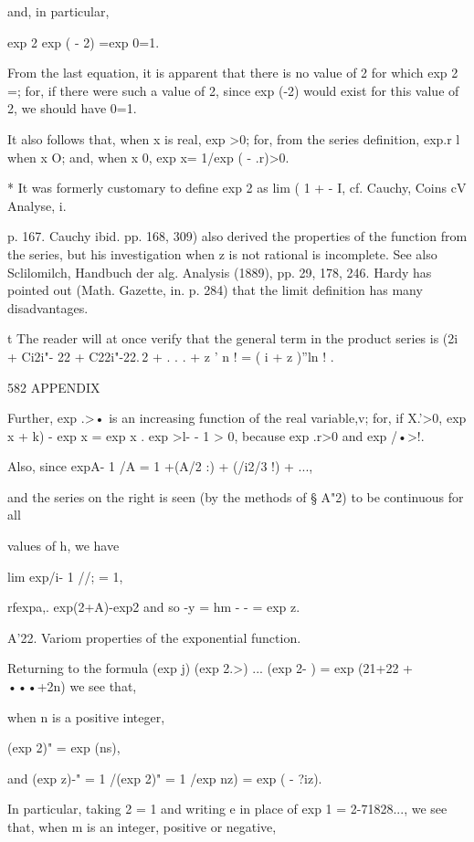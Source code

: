 and, in particular,

 exp 2 exp ( - 2) =exp 0=1.

From the last equation, it is apparent that there is no value of 2 for
which exp 2 =; for, if there were such a value of 2, since exp (-2)
would exist for this value of 2, we should have 0=1.

It also follows that, when x is real, exp >0; for, from the series
definition, exp.r l when x O; and, when x 0, exp x= 1/exp ( - .r)>0.



* It was formerly customary to define exp 2 as lim ( 1 + - I, cf.
  Cauchy, Coins cV Analyse, i.

p. 167. Cauchy ibid. pp. 168, 309) also derived the properties of the
function from the series, but his investigation when z is not rational
is incomplete. See also Sclilomilch, Handbuch der alg. Analysis
(1889), pp. 29, 178, 246. Hardy has pointed out (Math. Gazette, in. p.
284) that the limit definition has many disadvantages.

t The reader will at once verify that the general term in the product
series is (2i + Ci2i"- 22 + C22i"-22.\,2 + . . . + z ' n ! = ( i + z
)''ln ! .



582 APPENDIX

Further, exp .>• is an increasing function of the real variable,v;
for, if X.'>0, exp x + k) - exp x = exp x . exp >l- - 1 > 0, because
exp .r>0 and exp /•>!.

Also, since expA- 1 /A = 1 +(A/2 :) + (/i2/3 !) + ...,

and the series on the right is seen (by the methods of § A"2) to be
continuous for all

values of h, we have

lim exp/i- 1 //; = 1,

rfexpa,. exp(2+A)-exp2 and so -y = hm - - = exp z.

A'22. Variom properties of the exponential function.

Returning to the formula (exp j) (exp 2.>) ... (exp 2- ) = exp (21+22
+ •••+2n) we see that,

when n is a positive integer,

(exp 2)" = exp (ns),

and (exp z)-" = 1 /(exp 2)" = 1 /exp nz) = exp ( - ?iz).

In particular, taking 2 = 1 and writing e in place of exp 1 =
2-71828..., we see that, when m is an integer, positive or negative,

